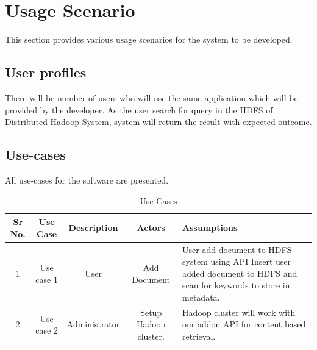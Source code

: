 \documentclass[oneside,a4paper,12pt]{report}
\begin{document}
  
\section{Usage Scenario}
This section provides various usage scenarios for the system to be developed.  
 \subsection{User profiles}  
There will be number of users who will use the same application which will be provided by the developer. As the user search for query in the HDFS of Distributed Hadoop System, system will return the result with expected outcome. 

\subsection{Use-cases}
All use-cases for the software are presented.

\begin{table}[!htbp]
\begin{center}
\def\arraystretch{1.5}
\begin{tabularx}{\textwidth}{| c | c | c | c | X |}
\hline
Sr No.	& Use Case	& Description	& Actors	& Assumptions \\
\hline
1 & Use case 1 & User & Add Document & User add document to HDFS system using API  Insert user added document to HDFS and scan for keywords to store in metadata.
\\ \hline
2 & Use case 2 & Administrator & Setup Hadoop cluster. & Hadoop cluster will work with our addon API for content based retrieval. \\ \hline

\hline
\end{tabularx}
\end{center}
\caption{Use Cases}
\label{tab:usecase}
\end{table}
\end{document}
